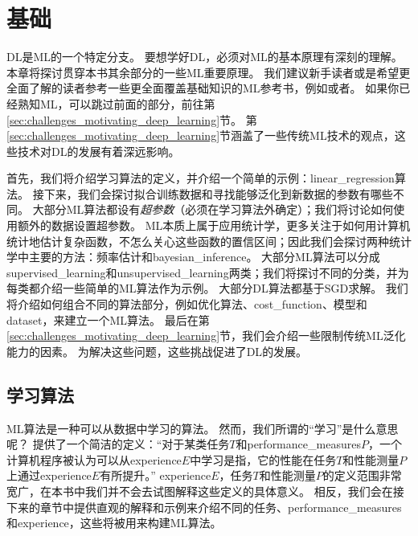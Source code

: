 \chapter{基础}
\label{chap:machine_learning_basics}
\gls{DL}是\gls{ML}的一个特定分支。
要想学好\gls{DL}，必须对\gls{ML}的基本原理有深刻的理解。
本章将探讨贯穿本书其余部分的一些\gls{ML}重要原理。
我们建议新手读者或是希望更全面了解的读者参考一些更全面覆盖基础知识的\gls{ML}参考书，例如\cite{MurphyBook2012}或者\cite{bishop-book2006}。
如果你已经熟知\gls{ML}，可以跳过前面的部分，前往第\ref{sec:challenges_motivating_deep_learning}节。
第\ref{sec:challenges_motivating_deep_learning}节涵盖了一些传统\gls{ML}技术的观点，这些技术对\gls{DL}的发展有着深远影响。

首先，我们将介绍学习算法的定义，并介绍一个简单的示例：\gls{linear_regression}算法。
接下来，我们会探讨拟合训练数据和寻找能够泛化到新数据的参数有哪些不同。
大部分\gls{ML}算法都设有\emph{超参数}（必须在学习算法外确定）；我们将讨论如何使用额外的数据设置超参数。
\gls{ML}本质上属于应用统计学，更多关注于如何用计算机统计地估计复杂函数，不怎么关心这些函数的置信区间；因此我们会探讨两种统计学中主要的方法：频率估计和\gls{bayesian_inference}。
大部分\gls{ML}算法可以分成\gls{supervised_learning}和\gls{unsupervised_learning}两类；我们将探讨不同的分类，并为每类都介绍一些简单的\gls{ML}算法作为示例。
大部分\gls{DL}算法都基于\gls{SGD}求解。
我们将介绍如何组合不同的算法部分，例如优化算法、\gls{cost_function}、模型和\gls{dataset}，来建立一个\gls{ML}算法。
最后在第\ref{sec:challenges_motivating_deep_learning}节，我们会介绍一些限制传统\gls{ML}泛化能力的因素。
为解决这些问题，这些挑战促进了\gls{DL}的发展。


\section{学习算法}
\label{sec:learning_algorithms}
\gls{ML}算法是一种可以从数据中学习的算法。
然而，我们所谓的``学习''是什么意思呢？
\cite{Mitchell:1997:ML}提供了一个简洁的定义：``对于某类任务$T$和\gls{performance_measures}$P$，一个计算机程序被认为可以从\gls{experience}$E$中学习是指，它的性能在任务$T$和性能测量$P$上通过\gls{experience}$E$有所提升。''
\gls{experience}$E$，任务$T$和性能测量$P$的定义范围非常宽广，在本书中我们并不会去试图解释这些定义的具体意义。
相反，我们会在接下来的章节中提供直观的解释和示例来介绍不同的任务、\gls{performance_measures}和\gls{experience}，这些将被用来构建\gls{ML}算法。


